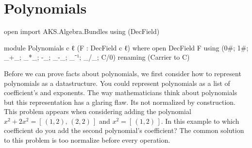 \documentclass[./Thesis.tex]{subfiles}
\begin{document}
\chapter{Polynomials}
\label{chap:polynomials}

\begin{code}[hide]
open import AKS.Algebra.Bundles using (DecField)
\end{code}
\begin{code}
module Polynomials {c ℓ} (F : DecField c ℓ) where
  open DecField F
    using (0#; 1#; _+_; _*_; -_; _-_; _⁻¹; _/_; C/0)
    renaming (Carrier to C)
\end{code}

Before we can prove facts about polynomials, we first consider how to represent
polynomials as a datastructure. You could represent polynomials as a list of
coefficient's and exponents. The way mathematicians think about polynomials but
this representation has a glaring flaw. Its not normalized by construction. This
problem appears when considering adding the polynomial
$x^2 + 2x^2 = [ \, (1, 2), \, (2, 2) \, ]$ 
and $x^2 = [ \, (1, 2) \, ]$. In this example to which coefficient do you add
the second polynomial's coefficient? The common solution to this problem is too
normalize before every operation. 
\end{document}
